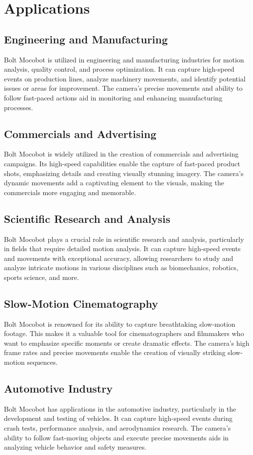 \documentclass[a4paper,11pt]{report}
\begin{document}
\chapter{Applications}
\section{Engineering and Manufacturing}
Bolt Mocobot is utilized in engineering and manufacturing industries for motion analysis, quality control, and process optimization. It can capture high-speed events on production lines, analyze machinery movements, and identify potential issues or areas for improvement. The camera's precise movements and ability to follow fast-paced actions aid in monitoring and enhancing manufacturing processes.
\section{Commercials and Advertising}
Bolt Mocobot is widely utilized in the creation of commercials and advertising campaigns. Its high-speed capabilities enable the capture of fast-paced product shots, emphasizing details and creating visually stunning imagery. The camera's dynamic movements add a captivating element to the visuals, making the commercials more engaging and memorable.
\section{Scientific Research and Analysis}
Bolt Mocobot plays a crucial role in scientific research and analysis, particularly in fields that require detailed motion analysis. It can capture high-speed events and movements with exceptional accuracy, allowing researchers to study and analyze intricate motions in various disciplines such as biomechanics, robotics, sports science, and more.
\section{Slow-Motion Cinematography}
Bolt Mocobot is renowned for its ability to capture breathtaking slow-motion footage. This makes it a valuable tool for cinematographers and filmmakers who want to emphasize specific moments or create dramatic effects. The camera's high frame rates and precise movements enable the creation of visually striking slow-motion sequences.
\section{Automotive Industry}
Bolt Mocobot has applications in the automotive industry, particularly in the development and testing of vehicles. It can capture high-speed events during crash tests, performance analysis, and aerodynamics research. The camera's ability to follow fast-moving objects and execute precise movements aids in analyzing vehicle behavior and safety measures.
\end{document}
